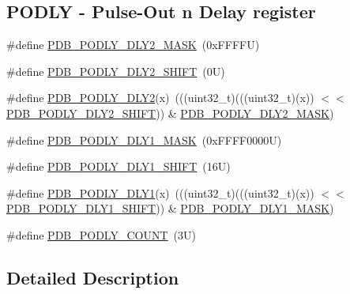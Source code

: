 \subsection*{P\+O\+D\+LY -\/ Pulse-\/\+Out n Delay register}
\begin{DoxyCompactItemize}
\item 
\#define \mbox{\hyperlink{group___p_d_b___register___masks_ga1b7c6a0b290ea82908b74e7b8c2f4009}{P\+D\+B\+\_\+\+P\+O\+D\+L\+Y\+\_\+\+D\+L\+Y2\+\_\+\+M\+A\+SK}}~(0x\+F\+F\+F\+F\+U)
\item 
\#define \mbox{\hyperlink{group___p_d_b___register___masks_gaa576ed647be6411616c3f6e6d03ab47c}{P\+D\+B\+\_\+\+P\+O\+D\+L\+Y\+\_\+\+D\+L\+Y2\+\_\+\+S\+H\+I\+FT}}~(0\+U)
\item 
\#define \mbox{\hyperlink{group___p_d_b___register___masks_ga47e4784ba83a37ab49598af71889500c}{P\+D\+B\+\_\+\+P\+O\+D\+L\+Y\+\_\+\+D\+L\+Y2}}(x)~(((uint32\+\_\+t)(((uint32\+\_\+t)(x)) $<$$<$ \mbox{\hyperlink{group___p_d_b___register___masks_gaa576ed647be6411616c3f6e6d03ab47c}{P\+D\+B\+\_\+\+P\+O\+D\+L\+Y\+\_\+\+D\+L\+Y2\+\_\+\+S\+H\+I\+FT}})) \& \mbox{\hyperlink{group___p_d_b___register___masks_ga1b7c6a0b290ea82908b74e7b8c2f4009}{P\+D\+B\+\_\+\+P\+O\+D\+L\+Y\+\_\+\+D\+L\+Y2\+\_\+\+M\+A\+SK}})
\item 
\#define \mbox{\hyperlink{group___p_d_b___register___masks_ga548246bef07975bd6f1fe0fe5a2c6ef5}{P\+D\+B\+\_\+\+P\+O\+D\+L\+Y\+\_\+\+D\+L\+Y1\+\_\+\+M\+A\+SK}}~(0x\+F\+F\+F\+F0000\+U)
\item 
\#define \mbox{\hyperlink{group___p_d_b___register___masks_ga0890f882369124f86428eea14c2eac88}{P\+D\+B\+\_\+\+P\+O\+D\+L\+Y\+\_\+\+D\+L\+Y1\+\_\+\+S\+H\+I\+FT}}~(16\+U)
\item 
\#define \mbox{\hyperlink{group___p_d_b___register___masks_gae6b4c6aa88511e952d5cd0938d11d854}{P\+D\+B\+\_\+\+P\+O\+D\+L\+Y\+\_\+\+D\+L\+Y1}}(x)~(((uint32\+\_\+t)(((uint32\+\_\+t)(x)) $<$$<$ \mbox{\hyperlink{group___p_d_b___register___masks_ga0890f882369124f86428eea14c2eac88}{P\+D\+B\+\_\+\+P\+O\+D\+L\+Y\+\_\+\+D\+L\+Y1\+\_\+\+S\+H\+I\+FT}})) \& \mbox{\hyperlink{group___p_d_b___register___masks_ga548246bef07975bd6f1fe0fe5a2c6ef5}{P\+D\+B\+\_\+\+P\+O\+D\+L\+Y\+\_\+\+D\+L\+Y1\+\_\+\+M\+A\+SK}})
\item 
\#define \mbox{\hyperlink{group___p_d_b___register___masks_ga52393343ff11ac023337b2a9e1353ac0}{P\+D\+B\+\_\+\+P\+O\+D\+L\+Y\+\_\+\+C\+O\+U\+NT}}~(3\+U)
\end{DoxyCompactItemize}


\subsection{Detailed Description}


